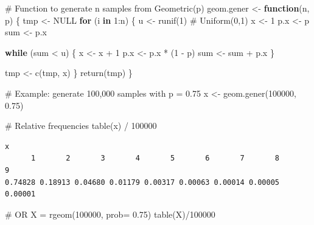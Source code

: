 \documentclass[
  letterpaper,
  DIV=11,
  numbers=noendperiod]{scrreprt}
\newenvironment{Shaded}{\begin{snugshade}}{\end{snugshade}}
\newcommand{\AttributeTok}[1]{\textcolor[rgb]{0.40,0.45,0.13}{#1}}
\newcommand{\CommentTok}[1]{\textcolor[rgb]{0.37,0.37,0.37}{#1}}
\newcommand{\ConstantTok}[1]{\textcolor[rgb]{0.56,0.35,0.01}{#1}}
\newcommand{\ControlFlowTok}[1]{\textcolor[rgb]{0.00,0.23,0.31}{\textbf{#1}}}
\newcommand{\DecValTok}[1]{\textcolor[rgb]{0.68,0.00,0.00}{#1}}
\newcommand{\FloatTok}[1]{\textcolor[rgb]{0.68,0.00,0.00}{#1}}
\newcommand{\FunctionTok}[1]{\textcolor[rgb]{0.28,0.35,0.67}{#1}}
\newcommand{\NormalTok}[1]{\textcolor[rgb]{0.00,0.23,0.31}{#1}}
\newcommand{\OtherTok}[1]{\textcolor[rgb]{0.00,0.23,0.31}{#1}}
\newcommand{\SpecialCharTok}[1]{\textcolor[rgb]{0.37,0.37,0.37}{#1}}
\begin{document}
\begin{Shaded}
\begin{Highlighting}[]
\CommentTok{\# Function to generate n samples from Geometric(p)}
\NormalTok{geom.gener }\OtherTok{\textless{}{-}} \ControlFlowTok{function}\NormalTok{(n, p) \{}
\NormalTok{  tmp }\OtherTok{\textless{}{-}} \ConstantTok{NULL}
  \ControlFlowTok{for}\NormalTok{ (i }\ControlFlowTok{in} \DecValTok{1}\SpecialCharTok{:}\NormalTok{n) \{}
\NormalTok{    u }\OtherTok{\textless{}{-}} \FunctionTok{runif}\NormalTok{(}\DecValTok{1}\NormalTok{)  }\CommentTok{\# Uniform(0,1)}
\NormalTok{    x }\OtherTok{\textless{}{-}} \DecValTok{1}
\NormalTok{    p.x }\OtherTok{\textless{}{-}}\NormalTok{ p}
\NormalTok{    sum }\OtherTok{\textless{}{-}}\NormalTok{ p.x}
    
    \ControlFlowTok{while}\NormalTok{ (sum }\SpecialCharTok{\textless{}}\NormalTok{ u) \{}
\NormalTok{      x }\OtherTok{\textless{}{-}}\NormalTok{ x }\SpecialCharTok{+} \DecValTok{1}
\NormalTok{      p.x }\OtherTok{\textless{}{-}}\NormalTok{ p.x }\SpecialCharTok{*}\NormalTok{ (}\DecValTok{1} \SpecialCharTok{{-}}\NormalTok{ p)}
\NormalTok{      sum }\OtherTok{\textless{}{-}}\NormalTok{ sum }\SpecialCharTok{+}\NormalTok{ p.x}
\NormalTok{    \}}
    
\NormalTok{    tmp }\OtherTok{\textless{}{-}} \FunctionTok{c}\NormalTok{(tmp, x)}
\NormalTok{  \}}
  \FunctionTok{return}\NormalTok{(tmp)}
\NormalTok{\}}

\CommentTok{\# Example: generate 100,000 samples with p = 0.75}
\NormalTok{x }\OtherTok{\textless{}{-}} \FunctionTok{geom.gener}\NormalTok{(}\DecValTok{100000}\NormalTok{, }\FloatTok{0.75}\NormalTok{)}

\CommentTok{\# Relative frequencies}
\FunctionTok{table}\NormalTok{(x) }\SpecialCharTok{/} \DecValTok{100000}
\end{Highlighting}
\end{Shaded}

\begin{verbatim}
x
      1       2       3       4       5       6       7       8       9 
0.74828 0.18913 0.04680 0.01179 0.00317 0.00063 0.00014 0.00005 0.00001 
\end{verbatim}

\begin{Shaded}
\begin{Highlighting}[]
\CommentTok{\# OR }
\NormalTok{X }\OtherTok{=} \FunctionTok{rgeom}\NormalTok{(}\DecValTok{100000}\NormalTok{, }\AttributeTok{prob=} \FloatTok{0.75}\NormalTok{)}
\FunctionTok{table}\NormalTok{(X)}\SpecialCharTok{/}\DecValTok{100000}
\end{Highlighting}
\end{Shaded}
\end{document}
